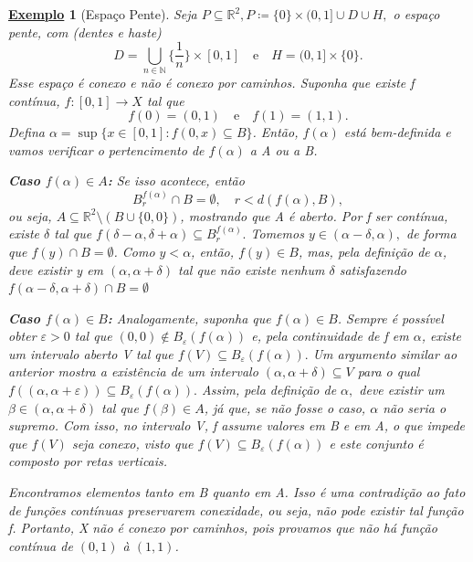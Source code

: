 \documentclass{article}
\newtheorem{example}{\underline{Exemplo}}
\begin{document}
 \begin{example}[Espaço Pente]
  Seja \(P\subseteq{\mathbb{R}^{2}}, P\coloneqq \{0\}\times (0,1]\cup D\cup H,\) o espaço pente, com (dentes e haste) 
    \[
      D = \bigcup_{n\in \mathbb{N}}^{}{\biggl\{\frac{1}{n}\biggr\}\times[0, 1]}\quad\text{e}\quad H = (0, 1]\times\{0\}.
    \]
  Esse espaço é conexo e não é conexo por caminhos. Suponha que existe f contínua, \(f:[0, 1]\rightarrow X\) tal que 
    \[
      f(0) = (0, 1)\quad\text{e}\quad f(1) = (1,1).
    \]
Defina \(\alpha  = \sup{\{x\in[0, 1]: f(0, x)\subseteq{B}\}}\). Então, \(f(\alpha )\) está bem-definida e vamos verificar o pertencimento de \(f(\alpha )\) a A ou a B.

\textbf{Caso \(f(\alpha )\in A\):}
  Se isso acontece, então 
    \[
      B_{r}^{f(\alpha )}\cap B = \emptyset,\quad r < d(f(\alpha ), B),
    \]
ou seja, \(A\subseteq{\mathbb{R}^{2}}\setminus{(B\cup \{0, 0\})}\), mostrando que A é aberto. Por f ser contínua, existe \(\delta \) tal que 
 \(f(\delta -\alpha , \delta +\alpha ) \subseteq{B_{r}^{f(\alpha )}}.\) Tomemos \(y\in (\alpha -\delta , \alpha ),\) de forma que \(f(y)\cap B = \emptyset\).
 Como \(y < \alpha \), então, \(f(y)\in B\), mas, pela definição de \(\alpha \), deve existir y em \((\alpha , \alpha +\delta )\) tal que não existe nenhum \(\delta \)
 satisfazendo \(f(\alpha -\delta ,\alpha +\delta )\cap B = \emptyset \)

\textbf{Caso \(f(\alpha )\in B\):}
  Analogamente, suponha que \(f(\alpha )\in B\). Sempre é possível obter \(\varepsilon >0\) tal que \((0, 0)\not\in B_{\varepsilon }(f(\alpha ))\) e, pela continuidade
de f em \(\alpha \), existe um intervalo aberto V tal que \(f(V)\subseteq{B_{\varepsilon }(f(\alpha ))}.\) Um argumento similar ao anterior mostra a existência de
um intervalo \((\alpha , \alpha +\delta ) \subseteq{V}\) para o qual \(f((\alpha , \alpha +\varepsilon ))\subseteq{B_{\varepsilon }(f(\alpha ))}.\) Assim, pela definição
de \(\alpha ,\) deve existir um \(\beta \in (\alpha , \alpha +\delta )\) tal que \(f(\beta)\in A\), já que, se não fosse o caso, \(\alpha \) não seria o supremo.
Com isso, no intervalo V, f assume valores em B e em A, o que impede que \(f(V)\) seja conexo, visto que \(f(V)\subseteq{B_{\varepsilon }(f(\alpha ))}\) e este conjunto
é composto por retas verticais. 

  Encontramos elementos tanto em B quanto em A. Isso é uma contradição ao fato de funções contínuas preservarem conexidade, ou seja, não pode existir tal função f. Portanto,
X não é conexo por caminhos, pois provamos que não há função contínua de \((0, 1)\) à \((1, 1)\).
  \end{example}
\end{document}
